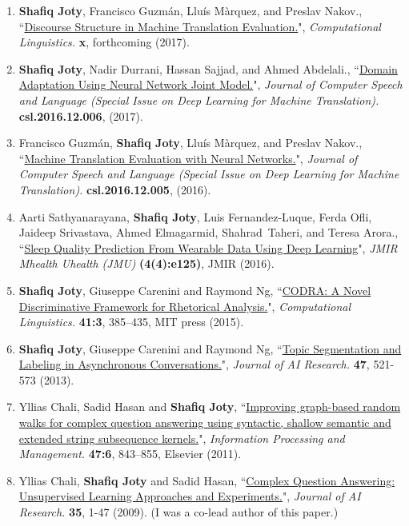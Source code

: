 \documentclass[paper=letter,fontsize=11pt]{scrartcl} %
\newcommand{\PaperEntry}[7]{
		\noindent #1, ``\href{#7}{#2}", \textit{#3} \textbf{#4}, #5 (#6).}
\begin{document}
\begin{enumerate}

\item \PaperEntry{\textbf{Shafiq Joty}, Francisco Guzmán, Lluís Màrquez, and Preslav Nakov.}{Discourse Structure in Machine Translation Evaluation.}{Computational Linguistics.}{x}{forthcoming}{2017}.
{}

\item \PaperEntry{\textbf{Shafiq Joty}, Nadir Durrani, Hassan Sajjad, and Ahmed Abdelali.}{Domain Adaptation Using Neural Network Joint Model.}{Journal of Computer Speech and Language (Special Issue on Deep Learning for Machine Translation).}{csl.2016.12.006}{}{2017}
{http://www.sciencedirect.com/science/article/pii/S0885230816301474}

\item \PaperEntry{Francisco Guzmán, \textbf{Shafiq Joty}, Lluís Màrquez, and Preslav Nakov.}{Machine Translation Evaluation with Neural Networks.}{Journal of Computer Speech and Language (Special Issue on Deep Learning for Machine Translation).}{csl.2016.12.005}{}{2016}
{http://www.sciencedirect.com/science/article/pii/S0885230816301693}

\item \PaperEntry{Aarti Sathyanarayana, \textbf{Shafiq Joty}, Luis Fernandez-Luque, Ferda Ofli, Jaideep Srivastava, Ahmed Elmagarmid, Shahrad~Taheri, and Teresa Arora.}{Sleep Quality Prediction From Wearable Data Using Deep Learning}{JMIR Mhealth Uhealth (JMU)}{(4(4):e125)}{JMIR}{2016}
{http://mhealth.jmir.org/2016/4/e125/}

\item \PaperEntry{\textbf{Shafiq Joty}, Giuseppe Carenini and Raymond Ng}{CODRA: A Novel Discriminative Framework for Rhetorical Analysis.}{Computational Linguistics.}{41:3}{385–435, MIT press}{2015}
{http://www.mitpressjournals.org/doi/abs/10.1162/COLI_a_00226\#.VloBH8YgjBE}

\item \PaperEntry{\textbf{Shafiq Joty}, Giuseppe Carenini and Raymond Ng}{Topic Segmentation and Labeling in Asynchronous Conversations.}{Journal of AI Research.}{47}{521-573}{2013}
{https://www.jair.org/media/3940/live-3940-7166-jair.pdf}

\item \PaperEntry{Yllias Chali, Sadid Hasan and \textbf{Shafiq Joty}}{Improving graph-based random walks for complex question answering using syntactic, shallow semantic and extended string subsequence kernels.}{Information Processing and Management.}{47:6}{843–855, Elsevier}{2011} 
{http://www.sciencedirect.com/science/article/pii/S0306457310000877}

\item \PaperEntry{Yllias Chali, \textbf{Shafiq Joty} and Sadid Hasan}{Complex Question Answering: Unsupervised Learning Approaches and Experiments.}{Journal of AI Research.}{35}{1-47}{2009} 
{https://www.jair.org/media/2784/live-2784-4446-jair.pdf} (I was a co-lead author of this paper.)


\end{enumerate}
\end{document}
